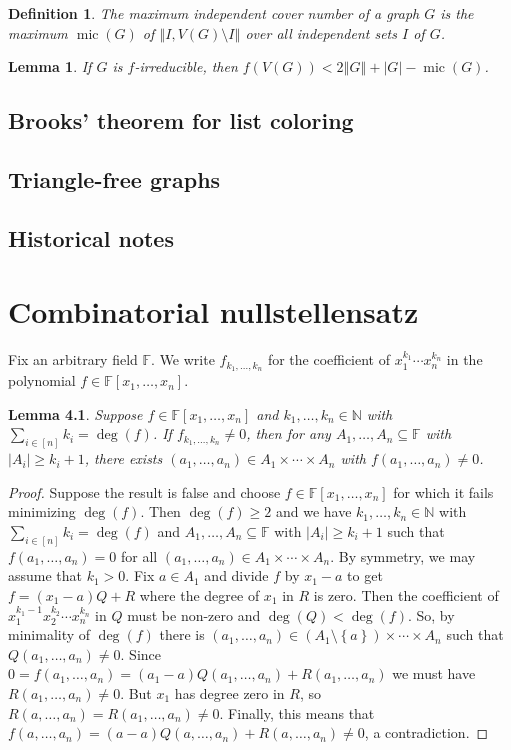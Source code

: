\documentclass[openany]{tufte-book} %
\theoremstyle{plain}
\newtheorem{definition}{Definition}
\newtheorem{lemma}{Lemma}
\newcommand{\set}[1]{\left\{ #1 \right\}}
\newcommand{\card}[1]{\left|#1\right|}
\newcommand{\size}[1]{\left\Vert#1\right\Vert}
\newcommand{\irange}[1]{\left[#1\right]}
\newcommand{\IN}{\mathbb{N}}
\newcommand{\mic}{\operatorname{mic}}
\begin{document}
\begin{definition} The \emph{maximum independent cover number }of a graph $G$
is the maximum $\mic(G)$ of $\size{I,V(G)\setminus I}$ over all independent sets $I$
of $G$. 
\end{definition}

\begin{lemma}
If $G$ is $f$-irreducible, then $f(V(G)) < 2\size{G} + |G| - \mic(G)$.
\end{lemma}
\section{Brooks' theorem for list coloring}
\section{Triangle-free graphs}
\section{Historical notes}

\chapter{Combinatorial nullstellensatz}
Fix an arbitrary field $\mathbb{F}$. We write $f_{k_1, \ldots, k_n}$ for the coefficient of $x_1^{k_1}\cdots x_n^{k_n}$ in the polynomial $f \in \mathbb{F}[x_1, \ldots, x_n]$. 
\begin{lemma}
Suppose $f \in \mathbb{F}[x_1, \ldots, x_n]$ and $k_1, \ldots, k_n \in \IN$ with $\sum_{i \in \irange{n}} k_i = \deg(f)$.  If $f_{k_1, \ldots, k_n} \ne 0$, then for any $A_1, \ldots, A_n \subseteq \mathbb{F}$ with $\card{A_i} \ge k_i + 1$, there exists $(a_1, \ldots, a_n) \in A_1 \times \cdots \times A_n$ with $f(a_1, \ldots, a_n) \ne 0$.
\end{lemma}
\begin{proof}
Suppose the result is false and choose $f \in \mathbb{F}[x_1, \ldots, x_n]$ for which it fails 
minimizing $\deg(f)$. Then $\deg(f) \ge 2$ and we have $k_1, \ldots, k_n \in \IN$ with $\sum_{i \in \irange{n}} k_i = \deg(f)$ and 
$A_1, \ldots, A_n \subseteq \mathbb{F}$ with $\card{A_i} \ge k_i + 1$ such that $f(a_1, \ldots, a_n) = 0$ for all $(a_1, \ldots, a_n) \in A_1 \times \cdots \times A_n$.  
By symmetry, we may assume that $k_1 > 0$.  Fix $a \in A_1$ and divide $f$ by $x_1 - a$ to get $f = (x_1 - a)Q + R$ where the degree of $x_1$ in $R$ is zero.  
Then the coefficient of $x_1^{k_1-1}x_2^{k_2} \cdots x_n^{k_n}$ in $Q$ must be non-zero and $\deg(Q) < \deg(f)$.  So, by minimality of $\deg(f)$ there 
is $(a_1, \ldots, a_n) \in (A_1 \setminus \set{a}) \times \cdots \times A_n$ such that $Q(a_1,\ldots, a_n) \ne 0$.  
Since $0 = f(a_1,\ldots, a_n) = (a_1 - a)Q(a_1,\ldots, a_n) + R(a_1,\ldots, a_n)$ we must have $R(a_1,\ldots, a_n) \ne 0$.  
But $x_1$ has degree zero in $R$, so $R(a,\ldots, a_n) = R(a_1,\ldots, a_n) \ne 0$.  
Finally, this means that $f(a,\ldots, a_n) = (a-a)Q(a,\ldots, a_n) + R(a,\ldots, a_n) \ne 0$, a contradiction.
\end{proof}
\end{document}

